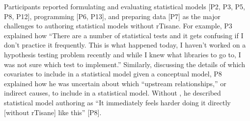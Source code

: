 


Participants reported formulating and evaluating statistical models [P2, P3, P5,
P8, P12], programming [P6, P13], and preparing data [P7] as the major challenges
to authoring statistical models without rTisane. For example, P3 explained how
``There are a number of statistical tests and it gets confusing if I don't
practice it frequently. This is what happened today, I haven't worked on a
hypothesis testing problem recently and while I knew what libraries to go to, I
was not sure which test to implement.'' Similarly, discussing the details of
which covariates to include in a statistical model given a conceptual model, P8
explained how he was uncertain about which ``upstream relationships,'' or
indirect causes, to include in a statistical model. Without \rTisane, he
described statistical model authoring as ``It immediately feels harder doing it
directly [without rTisane] like this'' [P8].

